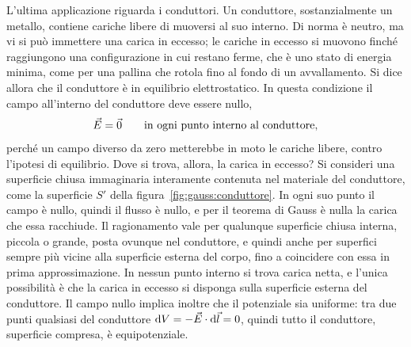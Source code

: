 \documentclass[11pt,a4paper]{article}
\begin{document}
L'ultima applicazione riguarda i conduttori. Un conduttore, sostanzialmente un metallo, contiene cariche libere di muoversi al suo interno. Di norma è neutro, ma vi si può immettere una carica in eccesso; le cariche in eccesso si muovono finché raggiungono una configurazione in cui restano ferme, che è uno stato di energia minima, come per una pallina che rotola fino al fondo di un avvallamento. Si dice allora che il conduttore è in equilibrio elettrostatico. In questa condizione il campo all'interno del conduttore deve essere nullo,
\[
\vec{E}=\vec{0}\qquad\text{in ogni punto interno al conduttore},
\]
perché un campo diverso da zero metterebbe in moto le cariche libere, contro l'ipotesi di equilibrio. Dove si trova, allora, la carica in eccesso? Si consideri una superficie chiusa immaginaria interamente contenuta nel materiale del conduttore, come la superficie $S'$ della figura~\ref{fig:gauss:conduttore}. In ogni suo punto il campo è nullo, quindi il flusso è nullo, e per il teorema di Gauss è nulla la carica che essa racchiude. Il ragionamento vale per qualunque superficie chiusa interna, piccola o grande, posta ovunque nel conduttore, e quindi anche per superfici sempre più vicine alla superficie esterna del corpo, fino a coincidere con essa in prima approssimazione. In nessun punto interno si trova carica netta, e l'unica possibilità è che la carica in eccesso si disponga sulla superficie esterna del conduttore. Il campo nullo implica inoltre che il potenziale sia uniforme: tra due punti qualsiasi del conduttore $\mathrm{d} V=-\vec{E}\cdot\mathrm{d}\vec{l}=0$, quindi tutto il conduttore, superficie compresa, è equipotenziale.
\end{document}
